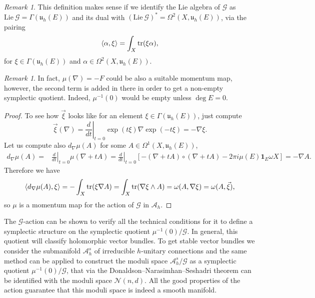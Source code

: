 \documentclass[12pt,a4paper]{book}
\theoremstyle{definition} \newtheorem{defn}[thm]{Definition}
\theoremstyle{definition} \newtheorem{ejemplo}[thm]{Example}
\theoremstyle{remark} \newtheorem{rem}[thm]{Remark}
\def\AA{\mathscr{A}}
\def\GG{\mathscr{G}}
\def\tr{\mathrm{tr}}
\def\id{\mathbf{1}}
\def\Lie{\mathrm{Lie}}
\def\uu{\mathfrak{u}}
\def\Bun{\mathscr{N}}
\let\emph\relax
\DeclarePairedDelimiter\esc{\langle}{\rangle}
\begin{document}
\begin{rem}
This definition makes sense if we identify the Lie algebra of $\GG$ as $\Lie\ \GG= \Gamma(\uu_h(E))$ and its dual with $(\Lie\ \GG)^*=\Omega^2(X,\uu_h(E))$, via the pairing
\begin{equation*}
  \esc{\alpha,\xi}=\int_X \tr(\xi \alpha),
\end{equation*}
for $\xi \in \Gamma(\uu_h(E))$ and $\alpha \in \Omega^2(X,\uu_h(E))$.
\end{rem}
\begin{rem}
In fact, $\mu(\nabla)=-F$ could be also a suitable momentum map, however, the second term is added in there in order to get a non-empty symplectic quotient. Indeed, $\mu^{-1}(0)$ would be empty unless $\deg E=0$.
\end{rem}
\begin{proof}
To see how $\vec{\xi}$ looks like for an element $\xi \in \Gamma(\uu_h(E))$, just compute
\begin{equation*}
  \vec{\xi}(\nabla)=\left.\frac{d}{dt}\right|_{t=0} \exp(t\xi)\nabla \exp(-t\xi)= -\nabla \xi.
\end{equation*}
Let us compute also $d_\nabla \mu (A)$ for some $A \in \Omega^1(X,\uu_h(E))$,
\begin{align*}
  d_\nabla \mu (A) =& \left.\frac{d}{dt} \right|_{t=0} \mu(\nabla + tA)=\left.\frac{d}{dt} \right|_{t=0} [-(\nabla +tA) \circ (\nabla + tA) -2\pi i \mu(E) \id_E \omega X ] = -\nabla A.
\end{align*}
Therefore we have
\begin{align*}
  \esc{d_\nabla \mu(A), \xi}=-\int_X \tr(\xi \nabla A) = \int_X \tr(\nabla \xi \wedge A) = \omega(A,\nabla \xi)=\omega(A,\vec{\xi}),
\end{align*}
so $\mu$ is a momentum map for the action of $\GG$ in $\AA_h$. 
\end{proof}

The $\GG$-action can be shown to verify all the technical conditions for it to define a symplectic structure on the symplectic quotient $\mu^{-1}(0)/\GG$. In general, this quotient will classify \emph{polystable} holomorphic vector bundles. To get stable vector bundles we consider the submanifold $\AA^s_h$ of irreducible $h$-unitary connections and the same method can be applied to construct the moduli space $\AA^s_h/\GG$ as a symplectic quotient $\mu^{-1}(0)/\GG$, that via the Donaldson--Narasimhan--Seshadri theorem can be identified with the moduli space $\Bun(n,d)$. All the good properties of the action guarantee that this moduli space is indeed a smooth manifold.
\end{document}
